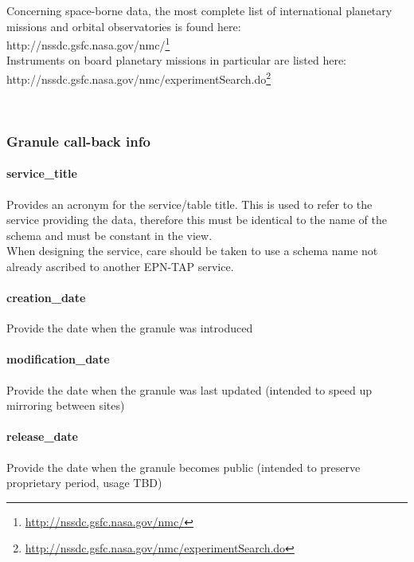 \documentclass[11pt,a4paper]{ivoa}
\begin{document}
Concerning space-borne data, the most complete list of international planetary missions and orbital observatories is found here:\\ http://nssdc.gsfc.nasa.gov/nmc/\footnote{\url{http://nssdc.gsfc.nasa.gov/nmc/}}\\ Instruments on board planetary missions in particular are listed here:\\ http://nssdc.gsfc.nasa.gov/nmc/experimentSearch.do\footnote{\url{http://nssdc.gsfc.nasa.gov/nmc/experimentSearch.do}}

 

\subsubsection{Granule call-back info}

\paragraph{service\_title}

Provides an acronym for the service/table title. This is used to refer to the service providing the data, therefore this must be identical to the name of the schema and must be constant in the view.\\When designing the service, care should be taken to use a schema name not already ascribed to another EPN-TAP service.

\paragraph{creation\_date}

Provide the date when the granule was introduced

\paragraph{modification\_date}

Provide the date when the granule was last updated (intended to speed up mirroring between sites)

\paragraph{release\_date}

Provide the date when the granule becomes public (intended to preserve proprietary period, usage TBD)

\end{document}
